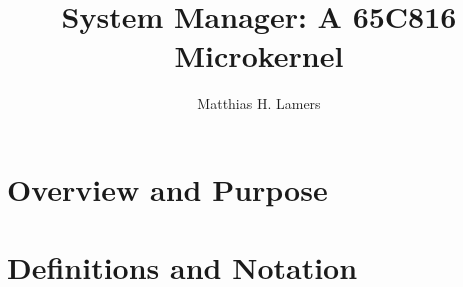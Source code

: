 \documentclass{article}
\title{System Manager: A 65C816 Microkernel}
\author{Matthias H. Lamers}
\begin{document}
	\maketitle
	
	\section*{Overview and Purpose}
	
	\section{Definitions and Notation}
\end{document}

